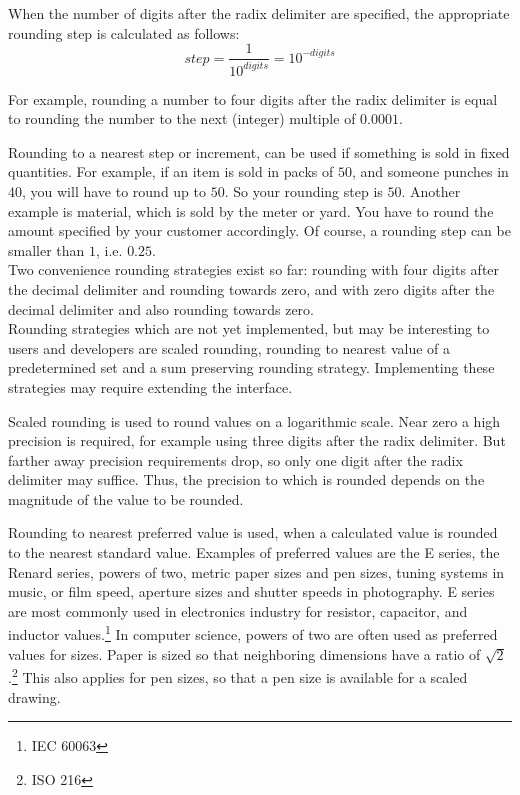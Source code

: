 When the number of digits after the radix delimiter are specified, the appropriate rounding step is calculated as follows:
\begin{equation*}
step = \frac{1}{10^{digits}} = 10^{-digits}
\end{equation*}

For example, rounding a number to four digits after the radix delimiter is equal to rounding the number to the next (integer) multiple of $0.0001$.

Rounding to a nearest step or increment, can be used if something is sold in fixed quantities.
For example, if an item is sold in packs of $50$, and someone punches in $40$, you will have to round up to $50$.
So your rounding step is $50$.
Another example is material, which is sold by the meter or yard.
You have to round the amount specified by your customer accordingly.
Of course, a rounding step can be smaller than $1$, i.e. $0.25$.
\\

Two convenience rounding strategies exist so far:  rounding with four digits after the decimal delimiter and rounding towards zero, and  with zero digits after the decimal delimiter and also rounding towards zero.
\\

Rounding strategies which are not yet implemented, but may be interesting to \salespoint{} users and developers are scaled rounding, rounding to nearest value of a predetermined set and a sum preserving rounding strategy.
Implementing these strategies may require extending the  interface.

Scaled rounding is used to round values on a logarithmic scale.
Near zero a high precision is required, for example using three digits after the radix delimiter.
But farther away precision requirements drop, so only one digit after the radix delimiter may suffice.
Thus, the precision to which is rounded depends on the magnitude of the value to be rounded.

Rounding to nearest preferred value is used, when a calculated value is rounded to the nearest standard value.
Examples of preferred values are the E series, the Renard series, powers of two, metric paper sizes and pen sizes, tuning systems in music, or film speed, aperture sizes and shutter speeds in photography.
E series are most commonly used in electronics industry for resistor, capacitor, and inductor values.\footnote{IEC 60063}
In computer science, powers of two are often used as preferred values for sizes.
Paper is sized so that neighboring dimensions have a ratio of $\sqrt2$.\footnote{ISO 216}
This also applies for pen sizes, so that a pen size is available for a scaled drawing.

